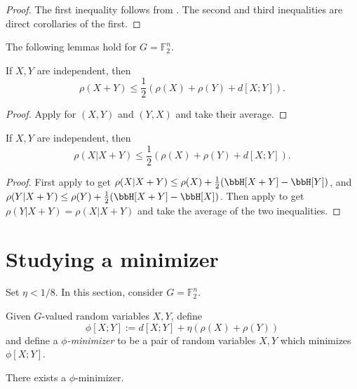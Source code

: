 \begin{proof}
  The first inequality follows from . The second and third inequalities are direct corollaries of the first.
\end{proof}

The following lemmas hold for $G=\mathbb{F}_2^n$.

\begin{lemma}\label{rho-sums-sym}\leanok  If $X,Y$ are independent, then
  $$ \rho(X+Y) \leq \frac{1}{2}(\rho(X)+\rho(Y) + d[X;Y]).$$
\end{lemma}
\begin{proof}
Apply  for $(X,Y)$ and $(Y,X)$ and take their average.
\end{proof}

\begin{lemma}\label{rho-cond-sym}\leanok
  If $X,Y$ are independent, then
  $$ \rho(X | X+Y) \leq \frac{1}{2}(\rho(X)+\rho(Y) + d[X;Y]).$$
\end{lemma}
\begin{proof}
  First apply  to get $\rho(X|X+Y)\le \rho(X) + \frac{1}{2}(\bbH[X+Y]-\bbH[Y])$, and $\rho(Y|X+Y)\le \rho(Y)+\frac{1}{2}(\bbH[X+Y]-\bbH[X])$. Then apply  to get $\rho(Y|X+Y)=\rho(X|X+Y)$ and take the average of the two inequalities.
\end{proof}

\section{Studying a minimizer}

Set $\eta < 1/8$. In this section, consider $G=\mathbb{F}_2^n$.

\begin{definition}\label{phi-min-def}\leanok  Given $G$-valued random variables $X,Y$, define
$$ \phi[X;Y] := d[X;Y] + \eta(\rho(X) + \rho(Y))$$
and define a \emph{$\phi$-minimizer} to be a pair of random variables $X,Y$ which minimizes $\phi[X;Y]$.
\end{definition}

\begin{lemma}\label{phi-min-exist}\leanok  There exists a $\phi$-minimizer.
\end{lemma}

